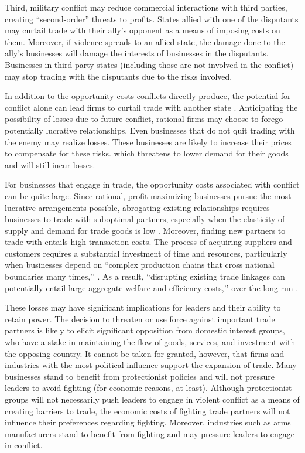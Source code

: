 \documentclass[../../dissertation.tex]{subfiles}
\begin{document}
Third, military conflict may reduce commercial interactions with third parties, creating ``second-order'' threats to profits. States allied with one of the disputants may curtail trade with their ally's opponent as a means of imposing costs on them. Moreover, if violence spreads to an allied state, the damage done to the ally’s businesses will damage the interests of businesses in the disputants. Businesses in third party states (including those are not involved in the conflict) may stop trading with the disputants due to the risks involved.

In addition to the opportunity costs conflicts directly produce, the potential for conflict alone can lead firms to curtail trade with another state \citep{li2002, long2008, morrow1998, morrow1999a}. Anticipating the possibility of losses due to future conflict, rational firms may choose to forego potentially lucrative relationships. Even businesses that do not quit trading with the enemy may realize losses. These businesses are likely to increase their prices to compensate for these risks. which threatens to lower demand for their goods and will still incur losses. 

For businesses that engage in trade, the opportunity costs associated with conflict can be quite large. Since rational, profit-maximizing businesses pursue the most lucrative arrangements possible, abrogating existing relationships requires businesses to trade with suboptimal partners, especially when the elasticity of supply and demand for trade goods is low \citep{polachek1992}. Moreover, finding new partners to trade with entails high transaction costs. The process of acquiring suppliers and customers requires a substantial investment of time and resources, particularly when businesses depend on ``complex production chains that cross national boundaries many times,’’ \citep[][29]{chaney2013}. As a result, ``disrupting existing trade linkages can potentially entail large aggregate welfare and efficiency costs,’’ over the long run \citep[][28]{chaney2013}. 

These losses may have significant implications for leaders and their ability to retain power. The decision to threaten or use force against important trade partners is likely to elicit significant opposition from domestic interest groups, who have a stake in maintaining the flow of goods, services, and investment with the opposing country. It cannot be taken for granted, however, that firms and industries with the most political influence support the expansion of trade. Many businesses stand to benefit from protectionist policies and will not pressure leaders to avoid fighting (for economic reasons, at least). Although protectionist groups will not necessarily push leaders to engage in violent conflict as a means of creating barriers to trade, the economic costs of fighting trade partners will not influence their preferences regarding fighting. Moreover, industries such as arms manufacturers stand to benefit from fighting and may pressure leaders to engage in conflict. 
\end{document}
